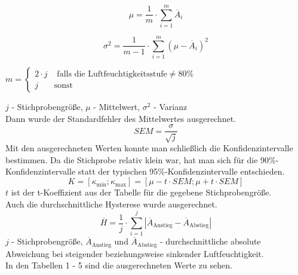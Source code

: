 \documentclass[runningheads]{llncs}
\begin{document}
\begin{equation}
\mu=\frac{1}{m}\cdot\sum_{i=1}^{m}\overline{A}_{i}
\label{formel3}
\end{equation}

\begin{equation}
\sigma^2=\frac{1}{m-1}\cdot\sum_{i=1}^{m}(\mu-\overline{A}_{i})^2
\label{formel4}
\end{equation}

\begin{center}
$
m = \begin{cases}
    2 \cdot j & \text{ falls die Luftfeuchtigkeitsstufe} \neq 80\% \\j  & \text{sonst}
\end{cases}
$
\end{center}
$j$ - Stichprobengröße, $\mu$ - Mittelwert, $\sigma^2$ - Varianz\\
Dann wurde der Standardfehler des Mittelwertes ausgerechnet.
\begin{equation}
SEM=\frac{\sigma}{\sqrt{j}}
\label{formel5}
\end{equation}
Mit den ausgerechneten Werten konnte man schließlich die Konfidenzintervalle bestimmen. Da die Stichprobe relativ klein war, hat man sich für die 90\%-Konfidenzintervalle statt der typischen 95\%-Konfidenzintervalle entschieden.
\begin{equation}
K=[\kappa_{\text{min}};\kappa_{\text{max}}]=[\mu-t\cdot SEM;\mu+t\cdot SEM]
\label{formel6}
\end{equation}
$t$ ist der t-Koeffizient aus der Tabelle für die gegebene Stichprobengröße.\\        
Auch die durchschnittliche Hysterese wurde ausgerechnet.
\begin{equation}
\overline{H}=\frac{1}{j}\cdot\sum_{i=1}^{j}|\overline{A}_{\text{Anstieg}}-\overline{A}_{\text{Abstieg}}|
\label{formel7}
\end{equation}
$j$ - Stichprobengröße, $\overline{A}_{\text{Anstieg}}$ und $\overline{A}_{\text{Abstieg}}$ - durchschnittliche absolute Abweichung bei steigender beziehungsweise sinkender Luftfeuchtigkeit.\\
In den Tabellen 1 - 5 sind die ausgerechneten Werte zu sehen.
\end{document}
